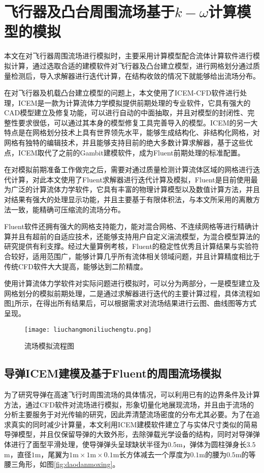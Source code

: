 \section{飞行器及凸台周围流场基于$k-\omega$计算模型的模拟}
本文在对飞行器周围流场进行模拟时，主要采用计算模型配合流体计算软件进行模拟计算，通过选取合适的建模软件对飞行器及凸台建立模型，进行网格划分通过质量检测后，导入求解器进行迭代计算，在结构收敛的情况下就能够给出流场分布。

在对飞行器及机载凸台建立模型的问题上，本文使用了ICEM-CFD软件进行处理，ICEM是一款为计算流体力学模拟提供前期处理的专业软件，它具有强大的CAD模型建立及修复功能，可以进行自动的中面抽取，并且对模型的封闭性、完整性要求很低，可以通过其本身的模型修复工具完善导入的模型。ICEM的另一大特点是在网格划分技术上具有世界领先水平，能够生成结构化、非结构化网格，对网格有独特的编辑技术，并且能够支持目前的绝大多数计算求解器，基于这些优点，ICEM取代了之前的Gambit建模软件，成为Fluent前期处理的标准配置。

在对模拟前期准备工作做完之后，需要对通过质量检测计算流体区域的网格进行迭代计算，对此本文使用了Fluent求解器进行迭代计算及模拟，Fluent是目前使用最为广泛的计算流体力学软件，它具有丰富的物理计算模型以及数值计算方法，并且对结果有强大的处理显示功能，并且主要基于有限体积法，与本文所采用的离散方法一致，能精确可压缩流的流场分布。

Fluent软件还拥有强大的网格支持能力，能对混合网格、不连续网格等进行精确计算并且有超前的自适应技术，还能够支持用户自定义湍流模型，为混合模型算法的研究提供有利支撑。经过大量算例考核，Fluent的稳定性优秀且计算结果与实验符合较好，适用范围广，能够计算几乎所有流体相关领域问题，并且计算精度相比于传统CFD软件大大提高，能够达到二阶精度。

使用计算流体力学软件对实际问题进行模拟时，可以分为两部分，一是模型建立及网格划分的模拟前期处理，二是通过求解器进行迭代的主要计算过程，具体流程如图\ref{fig:liuchangmoniliucheng}所示，在得出所有结果后，可以根据需求对流场结果进行云图、曲线图等方式呈现。
\begin{figure}[bhtp]
\centering
\texttt{[image: liuchangmoniliuchengtu.png]}
\caption{流场模拟流程图}
\label{fig:liuchangmoniliucheng}
\end{figure}
\subsection{导弹ICEM建模及基于Fluent的周围流场模拟}
为了研究导弹在高速飞行时周围流场的具体情况，可以利用已有的边界条件及计算方法，通过CFD软件对流场进行模拟，形象切量化地展现流场，并且由于流场的分析主要服务于对光传输的研究，因此弄清楚流场密度的分布尤其必要。为了在追求真实的同时减少计算量，本文利用ICEM建模软件建立了与实体尺寸类似的简易导弹模型，并且仅保留导弹的大致外形，去除弹载光学设备的结构，同时对导弹弹体进行了面型平滑处理，使导弹弹头呈球缺状半径为$0.5$m，弹体为圆柱弹身长$3.5$m，直径$1$m，尾翼为$1\text{m}\times1\text{m}\times0.1\text{m}$长方体减去一个厚度为$0.1$m的腰为$0.5$m的等腰三角形，如图\ref{fig:daodanmoxing}。

